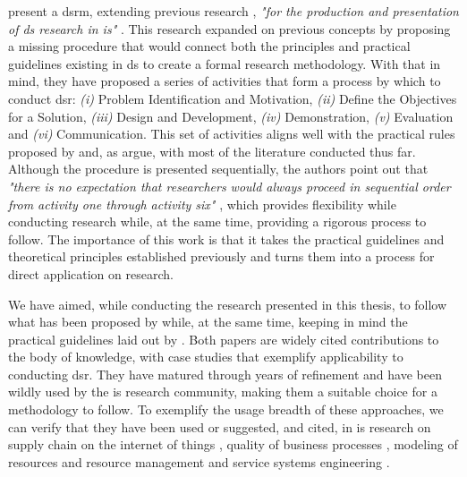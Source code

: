 \citeauthor{peffers_design_2007} \cite{peffers_design_2007} present a \gls{dsrm}, extending previous research \cite{march_design_1995, hevner_design_2004}, \textit{"for the production and presentation of \gls{ds} research in \gls{is}"} \cite[3]{peffers_design_2007}. This research expanded on previous concepts by proposing a missing procedure \cite[7]{peffers_design_2007} that would connect both the principles and practical guidelines existing in \gls{ds} to create a formal research methodology. With that in mind, they have proposed a series of activities that form a process by which to conduct \gls{dsr}: \emph{(i)} Problem Identification and Motivation, \emph{(ii)} Define the Objectives for a Solution, \emph{(iii)} Design and Development, \emph{(iv)} Demonstration, \emph{(v)} Evaluation and \emph{(vi)} Communication. This set of activities aligns well with the practical rules proposed by \citeauthor{hevner_design_2004} \cite{hevner_design_2004} and, as \citeauthor{peffers_design_2007} argue, with most of the literature conducted thus far. Although the procedure is presented sequentially, the authors point out that \textit{"there is no expectation that researchers would always proceed in sequential order from activity one through activity six"} \cite[14]{peffers_design_2007}, which provides flexibility while conducting research while, at the same time, providing a rigorous process to follow. The importance of this work is that it takes the practical guidelines and theoretical principles established previously and turns them into a process for direct application on research.

We have aimed, while conducting the research presented in this thesis, to follow what has been proposed by \citeauthor{peffers_design_2007} \cite{peffers_design_2007} while, at the same time, keeping in mind the practical guidelines laid out by \citeauthor{hevner_design_2004} \cite{hevner_design_2004}. Both papers are widely cited contributions to the body of knowledge, with case studies that exemplify applicability to conducting \gls{dsr}. They have matured through years of refinement and have been wildly used by the \gls{is} research community, making them a suitable choice for a methodology to follow. To exemplify the usage breadth of these approaches, we can verify that they have been used or suggested, and cited, in \gls{is} research on supply chain on the internet of things \cite{geerts_supply_2014}, quality of business processes \cite{heidari_quality_2014}, modeling of resources and resource management \cite{speitkamp_mathematical_2010} and service systems engineering \cite{bohmann_service_2014}.

